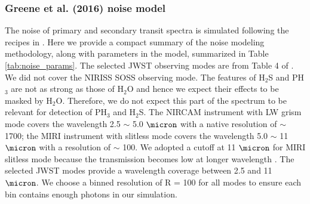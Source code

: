 \documentclass[twocolumn]{aastex61}
\begin{document}
\subsubsection{Greene et al. (2016) noise model}
The noise of primary and secondary transit spectra is simulated following the 
recipes in \citet{Greene16}. Here we provide a compact summary of the noise modeling methodology, along with parameters in the model, summarized in Table \ref{tab:noise_params}. The selected JWST observing modes are from Table 4 of \citet{Greene16}. We did not cover the NIRISS SOSS observing mode. The features of H$_2$S and PH$_3$ are not as strong as those of H$_2$O and hence we expect their effects to be masked by H$_2$O. Therefore, we do not expect this part of the spectrum to be relevant for detection of PH$_3$ and H$_2$S. The NIRCAM instrument with LW grism mode covers the wavelength 2.5 $\sim$ 5.0 $\micron$ with a native resolution of $\sim$ 1700; the MIRI instrument with slitless mode covers the wavelength 5.0 $\sim$ 11 $\micron$ with a resolution of $\sim$ 100. We adopted a cutoff at 11 $\micron$ for MIRI slitless mode because the transmission becomes low at longer wavelength \citep{Kendrew15}. The selected JWST modes provide a wavelength coverage between 2.5 and 11 $\micron$. We choose a binned resolution of R = 100 for all modes to ensure each bin contains enough photons in our simulation. 
\end{document}
